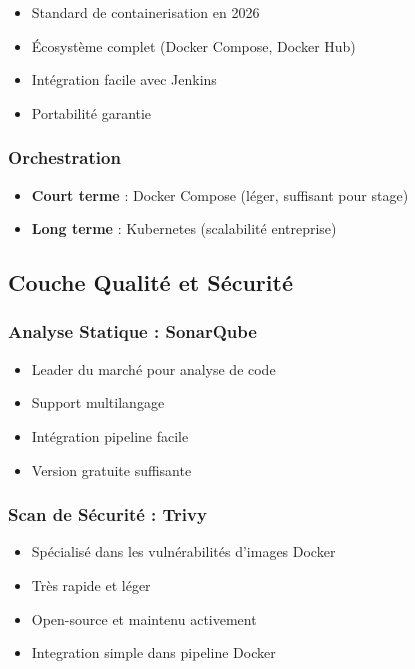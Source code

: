 \documentclass[12pt,a4paper]{report}
\begin{document}
\begin{itemize}
    \item Standard de containerisation en 2026
    \item Écosystème complet (Docker Compose, Docker Hub)
    \item Intégration facile avec Jenkins
    \item Portabilité garantie
\end{itemize}

\subsubsection{Orchestration}

\begin{itemize}
    \item \textbf{Court terme} : Docker Compose (léger, suffisant pour stage)
    \item \textbf{Long terme} : Kubernetes (scalabilité entreprise)
\end{itemize}

\subsection{Couche Qualité et Sécurité}

\subsubsection{Analyse Statique : SonarQube}

\begin{itemize}
    \item Leader du marché pour analyse de code
    \item Support multilangage
    \item Intégration pipeline facile
    \item Version gratuite suffisante
\end{itemize}

\subsubsection{Scan de Sécurité : Trivy}

\begin{itemize}
    \item Spécialisé dans les vulnérabilités d'images Docker
    \item Très rapide et léger
    \item Open-source et maintenu activement
    \item Integration simple dans pipeline Docker
\end{itemize}
\end{document}
